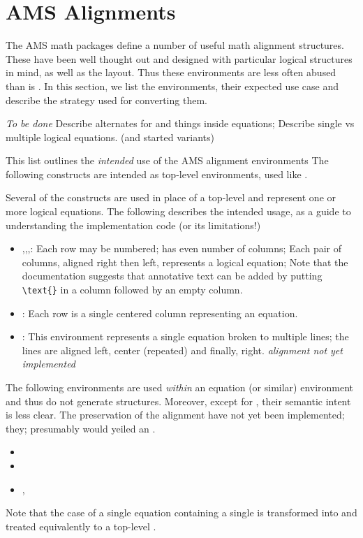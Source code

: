 \documentclass{book}
\begin{document}
\section{AMS Alignments}\label{alignments.amsalign}
The AMS math packages define a number of useful math alignment structures.
These have been well thought out and designed with particular logical
structures in mind, as well as the layout. Thus these environments are
less often abused than is .  In this section, we list
the environments, their expected use case and describe the strategy used
for converting them.

\emph{To be done}
Describe alternates for  and things inside equations;
Describe single vs multiple logical equations.
(and started variants)

This list outlines the \emph{intended} use of the AMS alignment environments
The following constructs are intended as top-level environments, used like .

Several of the constructs are used in place of a top-level 
and represent one or more logical equations.  The following describes
the intended usage, as a guide to understanding the implementation code (or its limitations!)
\begin{itemize}
\item {},,,:
  Each row may be numbered; has even number of columns;
  Each pair of columns, aligned right then left, represents a logical equation;
  Note that the documentation suggests that annotative text can be added
  by putting \verb|\text{}| in a column followed by an empty column.  
\item {}:
  Each row is a single centered column representing an equation.
\item {}:
  This environment represents a single equation broken to multiple lines;
  the lines are aligned left, center (repeated) and finally, right.
  \emph{alignment not yet implemented}
\end{itemize}
The following environments are used \emph{within} an equation (or similar)
environment and thus do not generate  structures.
Moreover, except for , their semantic intent is less clear.
The preservation of the alignment have not yet been implemented;
they; presumably would yeiled an .
\begin{itemize}
\item {}
\item {}
\item {},
\end{itemize}
Note that the case of a single equation containing a single 
is transformed into and treated equivalently to a top-level .
\end{document}
